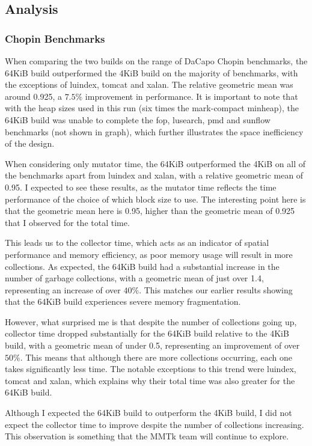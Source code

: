 \documentclass{article}
\begin{document}
\subsection{Analysis}
\subsubsection{Chopin Benchmarks}
When comparing the two builds on the range of DaCapo Chopin benchmarks, the 64KiB build outperformed the 4KiB build on the majority of benchmarks, with the exceptions of luindex, tomcat and xalan. The relative geometric mean was around 0.925, a $7.5\%$ improvement in performance. It is important to note that with the heap sizes used in this run (six times the mark-compact minheap), the 64KiB build was unable to complete the fop, lusearch, pmd and sunflow benchmarks (not shown in graph), which further illustrates the space inefficiency of the design.

When considering only mutator time, the 64KiB outperformed the 4KiB on all of the benchmarks apart from luindex and xalan, with a relative geometric mean of 0.95. I expected to see these results, as the mutator time reflects the time performance of the choice of which block size to use. The interesting point here is that the geometric mean here is 0.95, higher than the geometric mean of 0.925 that I observed for the total time.

This leads us to the collector time, which acts as an indicator of spatial performance and memory efficiency, as poor memory usage will result in more collections. As expected, the 64KiB build had a substantial increase in the number of garbage collections, with a geometric mean of just over 1.4, representing an increase of over $40\%$. This matches our earlier results showing that the 64KiB build experiences severe memory fragmentation.

However, what surprised me is that despite the number of collections going up, collector time dropped substantially for the 64KiB build relative to the 4KiB build, with a geometric mean of under 0.5, representing an improvement of over $50\%$. This means that although there are more collections occurring, each one takes significantly less time. The notable exceptions to this trend were luindex, tomcat and xalan, which explains why their total time was also greater for the 64KiB build.

Although I expected the 64KiB build to outperform the 4KiB build, I did not expect the collector time to improve despite the number of collections increasing. This observation is something that the MMTk team will continue to explore.
\end{document}
